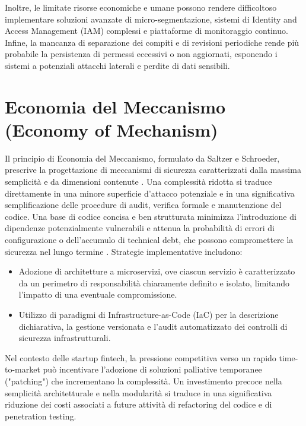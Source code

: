Inoltre, le limitate risorse economiche e umane possono rendere difficoltoso implementare soluzioni avanzate di micro-segmentazione, sistemi di Identity and Access Management (IAM) complessi e piattaforme di monitoraggio continuo. Infine, la mancanza di separazione dei compiti e di revisioni periodiche rende più probabile la persistenza di permessi eccessivi o non aggiornati, esponendo i sistemi a potenziali attacchi laterali e perdite di dati sensibili.

\section{Economia del Meccanismo (Economy of Mechanism)}
Il principio di Economia del Meccanismo, formulato da Saltzer e Schroeder, prescrive la progettazione di meccanismi di sicurezza caratterizzati dalla massima semplicità e da dimensioni contenute \cite{Saltzer_Schroeder_1975}. Una complessità ridotta si traduce direttamente in una minore superficie d'attacco potenziale e in una significativa semplificazione delle procedure di audit, verifica formale e manutenzione del codice. Una base di codice concisa e ben strutturata minimizza l'introduzione di dipendenze potenzialmente vulnerabili e attenua la probabilità di errori di configurazione o dell'accumulo di technical debt, che possono compromettere la sicurezza nel lungo termine \cite{Smith_2012_SaltzerReview}.
Strategie implementative includono:
\begin{itemize}
\item Adozione di architetture a microservizi, ove ciascun servizio è caratterizzato da un perimetro di responsabilità chiaramente definito e isolato, limitando l'impatto di una eventuale compromissione.
\item Utilizzo di paradigmi di Infrastructure-as-Code (IaC) per la descrizione dichiarativa, la gestione versionata e l'audit automatizzato dei controlli di sicurezza infrastrutturali.
\end{itemize}
Nel contesto delle startup fintech, la pressione competitiva verso un rapido time-to-market può incentivare l'adozione di soluzioni palliative temporanee ("patching") che incrementano la complessità. Un investimento precoce nella semplicità architetturale e nella modularità si traduce in una significativa riduzione dei costi associati a future attività di refactoring del codice e di penetration testing.
